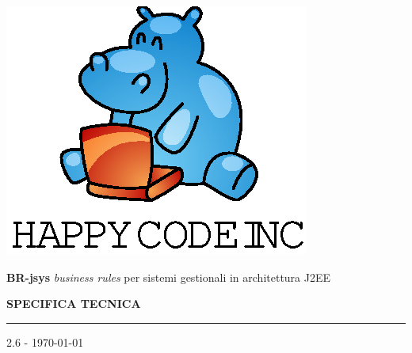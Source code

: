 \documentclass[11pt,titlepage,a4paper]{report}
\begin{document}
\newcommand{\lv}{2.6} %
\newcommand{\Glossario}{ Glossario.1.4.pdf }


\begin{titlepage}
\begin{center}
\vspace*{0.5in}
\includegraphics{logo.eps}
\vspace*{0.2in}

{\Large \textbf{BR-jsys}}
{\Large \emph{business rules} per sistemi gestionali in architettura J2EE } 
\vspace{2in}

\LARGE \textbf {SPECIFICA TECNICA}
\par\rule{10cm}{0.4pt} \par {\Large 2.6 - \today}


\end{center}
\end{titlepage}
\vspace*{0.5in}
\end{document}
